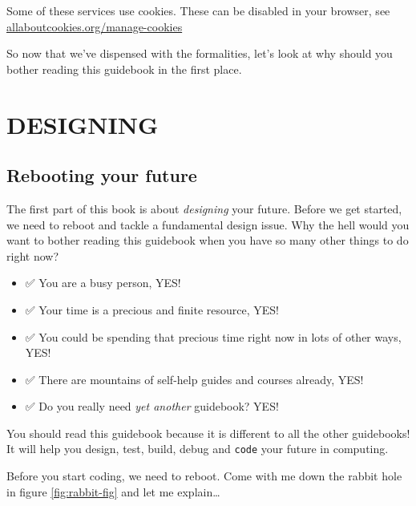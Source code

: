\documentclass[
]{book}
\providecommand{\tightlist}{%
  \setlength{\itemsep}{0pt}\setlength{\parskip}{0pt}}
\begin{document}
Some of these services use cookies. These can be disabled in your browser, see \href{https://www.allaboutcookies.org/manage-cookies/}{allaboutcookies.org/manage-cookies}

So now that we've dispensed with the formalities, let's look at why should you bother reading this guidebook in the first place.

















\hypertarget{part-designing}{%
\part{DESIGNING}\label{part-designing}}

\hypertarget{rebooting}{%
\chapter{Rebooting your future}\label{rebooting}}

The first part of this book is about \emph{designing} your future. Before we get started, we need to reboot and tackle a fundamental design issue. Why the hell would you want to bother reading this guidebook when you have so many other things to do right now?

\begin{itemize}
\tightlist
\item
  ✅ You are a busy person, YES!
\item
  ✅ Your time is a precious and finite resource, YES!
\item
  ✅ You could be spending that precious time right now in lots of other ways, YES!
\item
  ✅ There are mountains of self-help guides and courses already, YES!
\item
  ✅ Do you really need \emph{yet another} guidebook? YES!
\end{itemize}

You should read this guidebook because it is different to all the other guidebooks! It will help you design, test, build, debug and \texttt{code} your future in computing.

Before you start coding, we need to reboot. Come with me down the rabbit hole in figure \ref{fig:rabbit-fig} and let me explain\ldots{} 🐇
\end{document}
